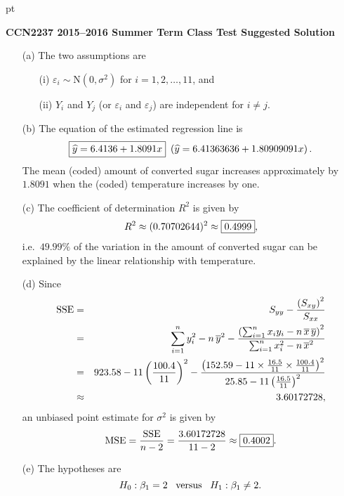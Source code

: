 \documentclass[11pt]{article}
\newcommand{\ds}{\displaystyle}
\begin{document}
 pt

\begin{center}
{\bf \large CCN2237 2015--2016 Summer Term Class Test Suggested Solution}
\end{center}

\vspace{0.3cm}


\begin{enumerate}
\item[(a)]
The two assumptions are
\begin{enumerate}
\item[(i)]
$\varepsilon_i \sim \mbox{N$(0, \sigma^2)$}$ for $i = 1, 2, \dots, 11$, and
\item[(ii)]
$Y_i$ and $Y_j$ (or $\varepsilon_i$ and $\varepsilon_j$) are independent for $i \ne j$.
\end{enumerate}
\item[(b)]
The equation of the estimated regression line is
$$
\fbox{$\ds \widehat{y} = 6.4136 + 1.8091x$} \ \left(\widehat{y} = 6.41363636 + 1.80909091x\right).
$$
The mean (coded) amount of converted sugar increases approximately by $1.8091$ when the (coded) temperature increases by one.
\item[(c)]
The coefficient of determination $R^2$ is given by
$$
R^2 \approx (0.70702644)^2 \approx \fbox{$0.4999$},
$$
i.e.~$49.99\%$ of the variation in the amount of converted sugar can be explained by the linear relationship with temperature.
\item[(d)]
Since
\begin{eqnarray*}
{\rm SSE} & = & S_{yy} - \frac{\left(S_{xy}\right)^2}{S_{xx}} \\
& = & \sum_{i=1}^n y_i^2 - n\,\overline{y}^2 - \frac{\left(\sum_{i=1}^n x_i y_i - n\,\overline{x}\,\overline{y}\right)^2}{\sum_{i=1}^n x_i^2 - n\,\overline{x}^2} \\
& = & 923.58 - 11\left(\frac{100.4}{11}\right)^2 - \frac{\left(152.59 - 11 \times \frac{16.5}{11} \times \frac{100.4}{11}\right)^2}{25.85 - 11\left(\frac{16.5}{11}\right)^2} \\
& \approx & 3.60172728,
\end{eqnarray*}
an unbiased point estimate for $\sigma^2$ is given by
$$
{\rm MSE} = \frac{{\rm SSE}}{n - 2} = \frac{3.60172728}{11 - 2} \approx \fbox{$0.4002$}.
$$
\item[(e)]
The hypotheses are
$$
H_0 : \beta_1 = 2 \ \ \, {\rm versus} \ \ \, H_1 : \beta_1 \ne 2.
$$
\end{enumerate}
\end{document}
